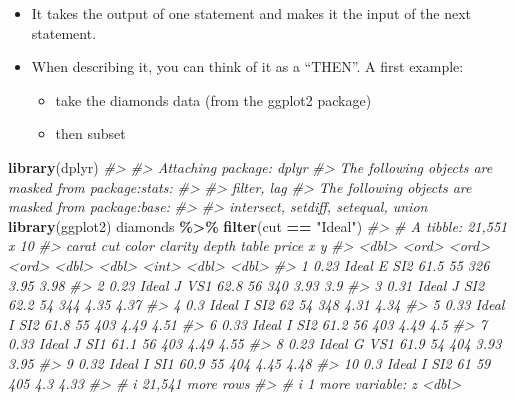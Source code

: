 \documentclass[
]{book}
\newenvironment{Shaded}{\begin{snugshade}}{\end{snugshade}}
\newcommand{\CommentTok}[1]{\textcolor[rgb]{0.56,0.35,0.01}{\textit{#1}}}
\newcommand{\FunctionTok}[1]{\textcolor[rgb]{0.13,0.29,0.53}{\textbf{#1}}}
\newcommand{\NormalTok}[1]{#1}
\newcommand{\SpecialCharTok}[1]{\textcolor[rgb]{0.81,0.36,0.00}{\textbf{#1}}}
\newcommand{\StringTok}[1]{\textcolor[rgb]{0.31,0.60,0.02}{#1}}
\providecommand{\tightlist}{%
  \setlength{\itemsep}{0pt}\setlength{\parskip}{0pt}}
\begin{document}
\begin{itemize}
\tightlist
\item
  It takes the output of one statement and makes it the input of the
  next statement.
\item
  When describing it, you can think of it as a ``THEN''. A first
  example:

  \begin{itemize}
  \tightlist
  \item
    take the diamonds data (from the ggplot2 package)
  \item
    then subset
  \end{itemize}
\end{itemize}

\begin{Shaded}
\begin{Highlighting}[]
\FunctionTok{library}\NormalTok{(dplyr)}
\CommentTok{\#\textgreater{} }
\CommentTok{\#\textgreater{} Attaching package: \textquotesingle{}dplyr\textquotesingle{}}
\CommentTok{\#\textgreater{} The following objects are masked from \textquotesingle{}package:stats\textquotesingle{}:}
\CommentTok{\#\textgreater{} }
\CommentTok{\#\textgreater{}     filter, lag}
\CommentTok{\#\textgreater{} The following objects are masked from \textquotesingle{}package:base\textquotesingle{}:}
\CommentTok{\#\textgreater{} }
\CommentTok{\#\textgreater{}     intersect, setdiff, setequal, union}
\FunctionTok{library}\NormalTok{(ggplot2)}
\NormalTok{diamonds }\SpecialCharTok{\%\textgreater{}\%} \FunctionTok{filter}\NormalTok{(cut }\SpecialCharTok{==} \StringTok{"Ideal"}\NormalTok{)}
\CommentTok{\#\textgreater{} \# A tibble: 21,551 x 10}
\CommentTok{\#\textgreater{}    carat cut   color clarity depth table price     x     y}
\CommentTok{\#\textgreater{}    \textless{}dbl\textgreater{} \textless{}ord\textgreater{} \textless{}ord\textgreater{} \textless{}ord\textgreater{}   \textless{}dbl\textgreater{} \textless{}dbl\textgreater{} \textless{}int\textgreater{} \textless{}dbl\textgreater{} \textless{}dbl\textgreater{}}
\CommentTok{\#\textgreater{}  1  0.23 Ideal E     SI2      61.5    55   326  3.95  3.98}
\CommentTok{\#\textgreater{}  2  0.23 Ideal J     VS1      62.8    56   340  3.93  3.9 }
\CommentTok{\#\textgreater{}  3  0.31 Ideal J     SI2      62.2    54   344  4.35  4.37}
\CommentTok{\#\textgreater{}  4  0.3  Ideal I     SI2      62      54   348  4.31  4.34}
\CommentTok{\#\textgreater{}  5  0.33 Ideal I     SI2      61.8    55   403  4.49  4.51}
\CommentTok{\#\textgreater{}  6  0.33 Ideal I     SI2      61.2    56   403  4.49  4.5 }
\CommentTok{\#\textgreater{}  7  0.33 Ideal J     SI1      61.1    56   403  4.49  4.55}
\CommentTok{\#\textgreater{}  8  0.23 Ideal G     VS1      61.9    54   404  3.93  3.95}
\CommentTok{\#\textgreater{}  9  0.32 Ideal I     SI1      60.9    55   404  4.45  4.48}
\CommentTok{\#\textgreater{} 10  0.3  Ideal I     SI2      61      59   405  4.3   4.33}
\CommentTok{\#\textgreater{} \# i 21,541 more rows}
\CommentTok{\#\textgreater{} \# i 1 more variable: z \textless{}dbl\textgreater{}}
\end{Highlighting}
\end{Shaded}
\end{document}

